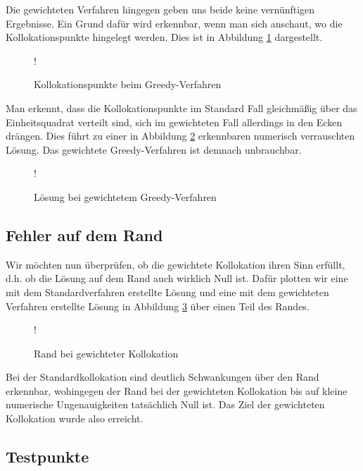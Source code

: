 Die gewichteten Verfahren hingegen geben uns beide keine vernünftigen Ergebnisse. Ein Grund dafür wird erkennbar, wenn man sich anschaut, wo die Kollokationspunkte hingelegt werden. Dies ist in Abbildung \ref{fig:greedy-points} dargestellt.
\begin{figure}[ht]
\centering
\resizebox {\columnwidth} {!} {

}
\caption{Kollokationspunkte beim Greedy-Verfahren}
\label{fig:greedy-points}
\end{figure}

Man erkennt, dass die Kollokationspunkte im Standard Fall gleichmäßig über das Einheitsquadrat verteilt sind, sich im gewichteten Fall allerdings in den Ecken drängen. Dies führt zu einer in Abbildung \ref{fig:greedy-verrauscht} erkennbaren numerisch verrauschten Lösung. Das gewichtete Greedy-Verfahren ist demnach unbrauchbar.

\begin{figure}[ht]
\centering
\resizebox {\columnwidth} {!} {

}
\caption{Lösung bei gewichtetem Greedy-Verfahren}
\label{fig:greedy-verrauscht}
\end{figure}

\subsection{Fehler auf dem Rand}

Wir möchten nun überprüfen, ob die gewichtete Kollokation ihren Sinn erfüllt, d.h. ob die Lösung auf dem Rand auch wirklich Null ist. Dafür plotten wir eine mit dem Standardverfahren erstellte Lösung und eine mit dem gewichteten Verfahren erstellte Lösung in Abbildung \ref{fig:rand-vergleich} über einen Teil des Randes.

\begin{figure}[ht]
\centering
\resizebox {\columnwidth} {!} {

}
\caption{Rand bei gewichteter Kollokation}
\label{fig:rand-vergleich}
\end{figure}

Bei der Standardkollokation sind deutlich Schwankungen über den Rand erkennbar, wohingegen der Rand bei der gewichteten Kollokation bis auf kleine numerische Ungenauigkeiten tatsächlich Null ist. Das Ziel der gewichteten Kollokation wurde also erreicht.

\subsection{Testpunkte}

